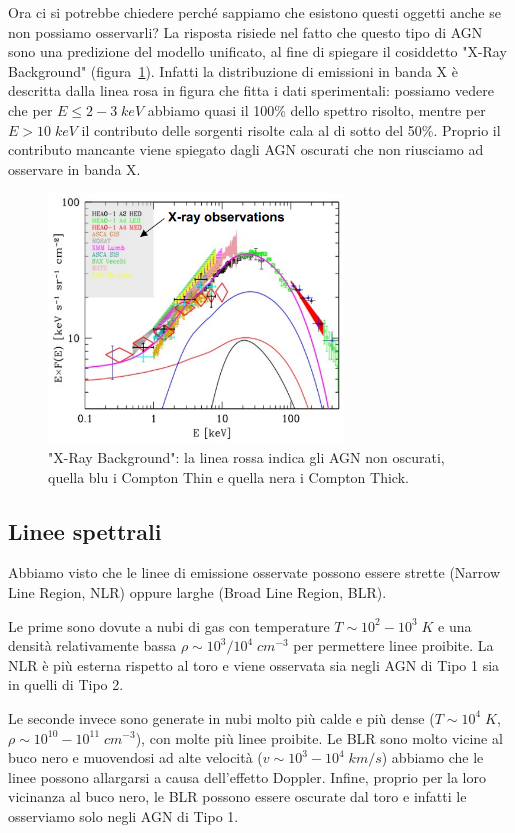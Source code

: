 Ora ci si potrebbe chiedere perché sappiamo che esistono questi oggetti anche se non possiamo osservarli? La risposta risiede nel fatto che questo tipo di AGN sono una predizione del modello unificato, al fine di spiegare il cosiddetto "X-Ray Background" (figura~\ref{fig:xrb-agn}). Infatti la distribuzione di emissioni in banda X è descritta dalla linea rosa in figura che fitta i dati sperimentali: possiamo vedere che per $E \leq 2-3 \;\si{keV}$ abbiamo quasi il 100\% dello spettro risolto, mentre per $E > 10 \;\si{keV}$ il contributo delle sorgenti risolte cala al di sotto del 50\%. Proprio il contributo mancante viene spiegato dagli AGN oscurati che non riusciamo ad osservare in banda X.

\begin{figure}
    \centering
    \includegraphics[width = 0.7\textwidth]{immagini/xrb-agn.png}
    \caption{"X-Ray Background": la linea rossa indica gli AGN non oscurati, quella blu i Compton Thin e quella nera i Compton Thick.}
    \label{fig:xrb-agn}
\end{figure}

\subsection{Linee spettrali}
Abbiamo visto che le linee di emissione osservate possono essere strette (Narrow Line Region, NLR) oppure larghe (Broad Line Region, BLR). 

Le prime sono dovute a nubi di gas con temperature $T \sim 10^2-10^3 \;\si{K}$ e una densità relativamente bassa $\rho \sim 10^3/10^4 \;\si{cm^{-3}}$ per permettere linee proibite. La NLR è più esterna rispetto al toro e viene osservata sia negli AGN di Tipo 1 sia in quelli di Tipo 2. 

Le seconde invece sono generate in nubi molto più calde e più dense ($T\sim 10^4 \;\si{K}$, $\rho \sim 10^{10}-10^{11} \;\si{cm^{-3}}$), con molte più linee proibite. Le BLR sono molto vicine al buco nero e muovendosi ad alte velocità ($v \sim 10^3-10^4 \;\si{km}/\si{s}$) abbiamo che le linee possono allargarsi a causa dell'effetto Doppler. Infine, proprio per la loro vicinanza al buco nero, le BLR possono essere oscurate dal toro e infatti le osserviamo solo negli AGN di Tipo 1.

